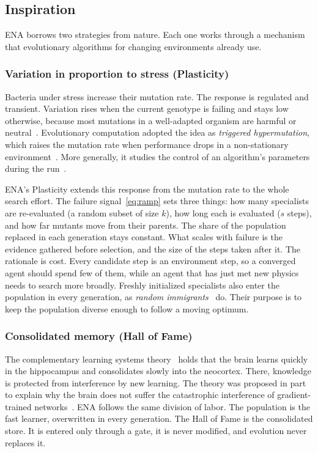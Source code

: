 \subsection{Inspiration}
\label{sec:inspiration}
ENA borrows two strategies from nature. Each one works through a mechanism that evolutionary algorithms for changing environments already use.

\subsubsection{Variation in proportion to stress (Plasticity)}
Bacteria under stress increase their mutation rate. The response is regulated and transient. Variation rises when the current genotype is failing and stays low otherwise, because most mutations in a well-adapted organism are harmful or neutral~\cite{galhardo2007mutation}. Evolutionary computation adopted the idea as \textit{triggered hypermutation}, which raises the mutation rate when performance drops in a non-stationary environment~\cite{cobb1990investigation}. More generally, it studies the control of an algorithm's parameters during the run~\cite{karafotias2015parameter}.

ENA's Plasticity extends this response from the mutation rate to the whole search effort. The failure signal~\eqref{eq:ramp} sets three things: how many specialists are re-evaluated (a random subset of size $k$), how long each is evaluated ($s$ steps), and how far mutants move from their parents. The share of the population replaced in each generation stays constant. What scales with failure is the evidence gathered before selection, and the size of the steps taken after it. The rationale is cost. Every candidate step is an environment step, so a converged agent should spend few of them, while an agent that has just met new physics needs to search more broadly. Freshly initialized specialists also enter the population in every generation, as \textit{random immigrants}~\cite{tinos2007self} do. Their purpose is to keep the population diverse enough to follow a moving optimum.

\subsubsection{Consolidated memory (Hall of Fame)}
The complementary learning systems theory~\cite{mcclelland1995there,kumaran2016learning} holds that the brain learns quickly in the hippocampus and consolidates slowly into the neocortex. There, knowledge is protected from interference by new learning. The theory was proposed in part to explain why the brain does not suffer the catastrophic interference of gradient-trained networks~\cite{mccloskey1989catastrophic}. ENA follows the same division of labor. The population is the fast learner, overwritten in every generation. The Hall of Fame is the consolidated store. It is entered only through a gate, it is never modified, and evolution never replaces it.


